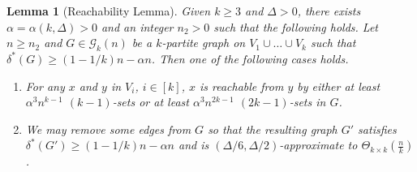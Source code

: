 \documentclass[reqno]{amsart}
\theoremstyle{plain}
\newtheorem{lemma}[theorem]{Lemma}
\def\G{\mathcal{G}}
\begin{document}
\begin{lemma}[Reachability Lemma]
\label{lem:reach}
Given $k\ge 3$ and $\Delta>0$, there exists $\alpha = \alpha(k, \Delta)>0$ and an integer $n_2>0$ such that the following holds.  Let $n\ge n_2$ and $G\in \G_k(n)$ be a $k$-partite graph on $V_1\cup \dots \cup V_k$ such that $\delta^*(G)\ge (1 - 1/k)n - \alpha n$. Then one of the following cases holds.
\begin{enumerate}
\item For any $x$ and $y$ in $V_i$, $i\in [k]$, $x$ is reachable from $y$ by either at least $\alpha^3 n^{k-1}$ $(k-1)$-sets or at least $\alpha^3 n^{2k-1}$ $(2k-1)$-sets in $G$.
\item We may remove some edges from $G$ so that the resulting graph $G'$ satisfies $\delta^*(G')\ge (1 - 1/k)n - \alpha n$ and is $(\Delta/6, \Delta/2)$-approximate to $\Theta_{k\times k}(\tfrac nk)$.
\end{enumerate}
\end{lemma}
\end{document}
